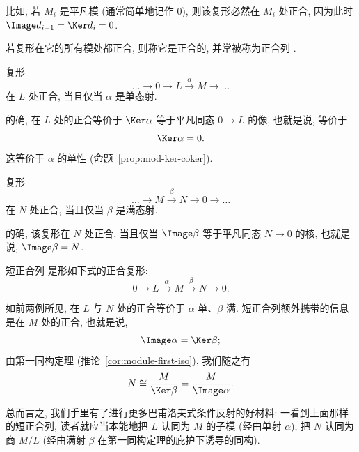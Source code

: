 比如, 若 $M_i$ 是平凡模 (通常简单地记作 $0$), 则该复形必然在 $M_i$ 处正合, 因为此时 $\Image d_{i+1} = \Ker d_i = 0$.

若复形在它的所有模处都正合, 则称它是正合的, 并常被称为正合列%
.

\begin{example}
\label{ex:exact-mono}
复形
\[
\dots \longrightarrow 0 \longrightarrow L \xrightarrow{\ \alpha\ } M \longrightarrow \dots
\]
在 $L$ 处正合, 当且仅当 $\alpha$ 是单态射.

的确, 在 $L$ 处的正合等价于 $\Ker \alpha$ 等于平凡同态 $0 \to L$ 的像, 也就是说, 等价于
\[
\Ker \alpha = 0.
\]
这等价于 $\alpha$ 的单性 (命题~\ref{prop:mod-ker-coker}).
\end{example}

\begin{example}
\label{ex:exact-epi}
复形
\[
\dots \longrightarrow M \xrightarrow{\ \beta\ } N \longrightarrow 0 \longrightarrow \dots
\]
在 $N$ 处正合, 当且仅当 $\beta$ 是满态射.

的确, 该复形在 $N$ 处正合, 当且仅当 $\Image \beta$ 等于平凡同态 $N \to 0$ 的核, 也就是说, $\Image \beta = N$.
\end{example}

\begin{definition}
\label{def:short-exact}
短正合列%
是形如下式的正合复形:
\[
0 \longrightarrow L \xrightarrow{\ \alpha\ } M \xrightarrow{\ \beta\ } N \longrightarrow 0.
\]
\end{definition}

如前两例所见, 在 $L$ 与 $N$ 处的正合等价于 $\alpha$ 单、$\beta$ 满. 短正合列额外携带的信息是在 $M$ 处的正合, 也就是说,
\[
\Image \alpha = \Ker \beta;
\]
由第一同构定理 (推论~\ref{cor:module-first-iso}), 我们随之有
\[
N \cong \frac{M}{\Ker \beta} = \frac{M}{\Image \alpha}.
\]

总而言之, 我们手里有了进行更多巴甫洛夫式条件反射的好材料: 一看到上面那样的短正合列, 读者就应当本能地把 $L$ 认同为 $M$ 的子模 (经由单射 $\alpha$), 把 $N$ 认同为商 $M/L$ (经由满射 $\beta$ 在第一同构定理的庇护下诱导的同构).

